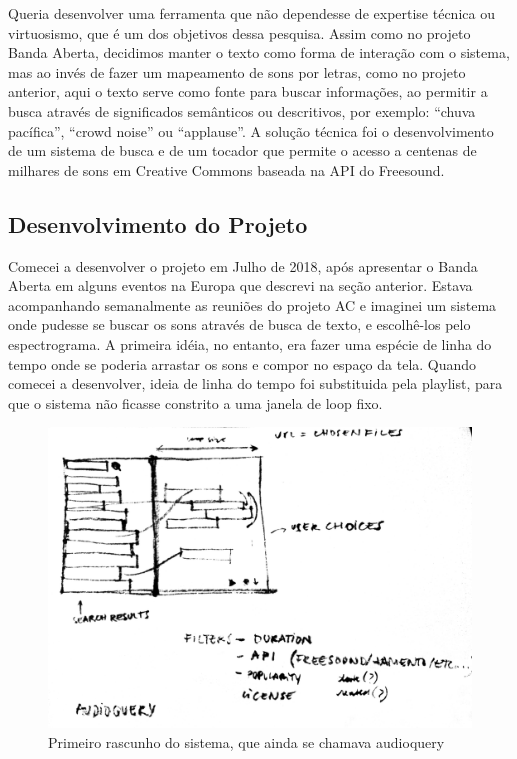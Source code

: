 Queria desenvolver uma ferramenta que não dependesse de expertise técnica ou virtuosismo, que é um dos objetivos dessa pesquisa. Assim como no projeto Banda Aberta, decidimos manter o texto como forma de interação com o sistema, mas ao invés de fazer um mapeamento de sons por letras, como no projeto anterior, aqui o texto serve como fonte para buscar informações, ao permitir a busca através de significados semânticos ou descritivos, por exemplo: ``chuva pacífica'', ``crowd noise'' ou ``applause''. A solução técnica foi o desenvolvimento de um sistema de busca e de um tocador que permite o acesso a centenas de milhares de sons em Creative Commons baseada na API do Freesound.


\subsection{Desenvolvimento do Projeto}

Comecei a desenvolver o projeto em Julho de 2018, após apresentar o Banda Aberta em alguns eventos na Europa que descrevi na seção anterior. Estava acompanhando semanalmente as reuniões do projeto AC e imaginei um sistema onde pudesse se buscar os sons através de busca de texto, e escolhê-los pelo espectrograma. A primeira idéia, no entanto, era fazer uma espécie de linha do tempo onde se poderia arrastar os sons e compor no espaço da tela. Quando comecei a desenvolver, ideia de linha do tempo foi substituida pela playlist, para que o sistema não ficasse constrito a uma janela de loop fixo. 

\begin{figure}

\includegraphics[width=1\textwidth]{pictures/cap4/firstsketch}
\caption{\label{firstsketch}Primeiro rascunho do sistema, que ainda se chamava audioquery}
\label{fig:firstsketch}
\end{figure}


